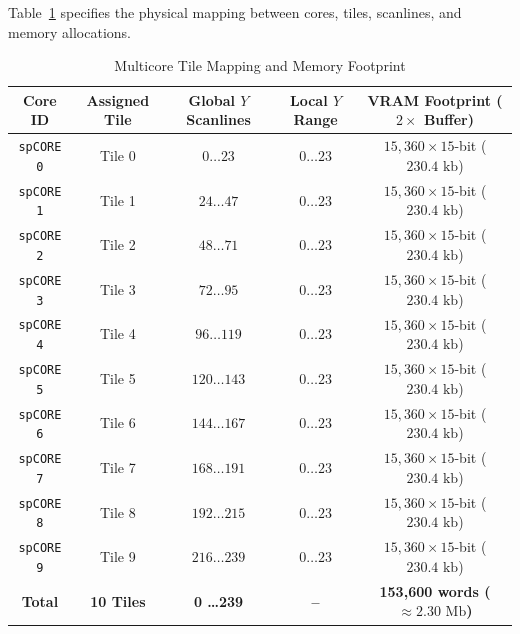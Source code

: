 Table~\ref{tab:tiling_map} specifies the physical mapping between cores, tiles, scanlines, and memory allocations.

\begin{table}[htbp]
\centering
\caption{Multicore Tile Mapping and Memory Footprint}
\label{tab:tiling_map}
\begin{tabular}{@{}ccccc@{}}
\toprule
\textbf{Core ID} & \textbf{Assigned Tile} & \textbf{Global $Y$ Scanlines} & \textbf{Local $Y$ Range} & \textbf{VRAM Footprint ($2\times$ Buffer)} \\ \midrule
\texttt{spCORE 0} & Tile 0 & $0 \dots 23$   & $0 \dots 23$ & $15{,}360 \times 15$-bit ($230.4\text{ kb}$) \\
\texttt{spCORE 1} & Tile 1 & $24 \dots 47$  & $0 \dots 23$ & $15{,}360 \times 15$-bit ($230.4\text{ kb}$) \\
\texttt{spCORE 2} & Tile 2 & $48 \dots 71$  & $0 \dots 23$ & $15{,}360 \times 15$-bit ($230.4\text{ kb}$) \\
\texttt{spCORE 3} & Tile 3 & $72 \dots 95$  & $0 \dots 23$ & $15{,}360 \times 15$-bit ($230.4\text{ kb}$) \\
\texttt{spCORE 4} & Tile 4 & $96 \dots 119$ & $0 \dots 23$ & $15{,}360 \times 15$-bit ($230.4\text{ kb}$) \\
\texttt{spCORE 5} & Tile 5 & $120 \dots 143$ & $0 \dots 23$ & $15{,}360 \times 15$-bit ($230.4\text{ kb}$) \\
\texttt{spCORE 6} & Tile 6 & $144 \dots 167$ & $0 \dots 23$ & $15{,}360 \times 15$-bit ($230.4\text{ kb}$) \\
\texttt{spCORE 7} & Tile 7 & $168 \dots 191$ & $0 \dots 23$ & $15{,}360 \times 15$-bit ($230.4\text{ kb}$) \\
\texttt{spCORE 8} & Tile 8 & $192 \dots 215$ & $0 \dots 23$ & $15{,}360 \times 15$-bit ($230.4\text{ kb}$) \\
\texttt{spCORE 9} & Tile 9 & $216 \dots 239$ & $0 \dots 23$ & $15{,}360 \times 15$-bit ($230.4\text{ kb}$) \\ \midrule
\textbf{Total} & \textbf{10 Tiles} & \textbf{0 \dots 239} & \textbf{--} & \textbf{153{,}600 words ($\approx 2.30\text{ Mb}$)} \\ \bottomrule
\end{tabular}
\end{table}

